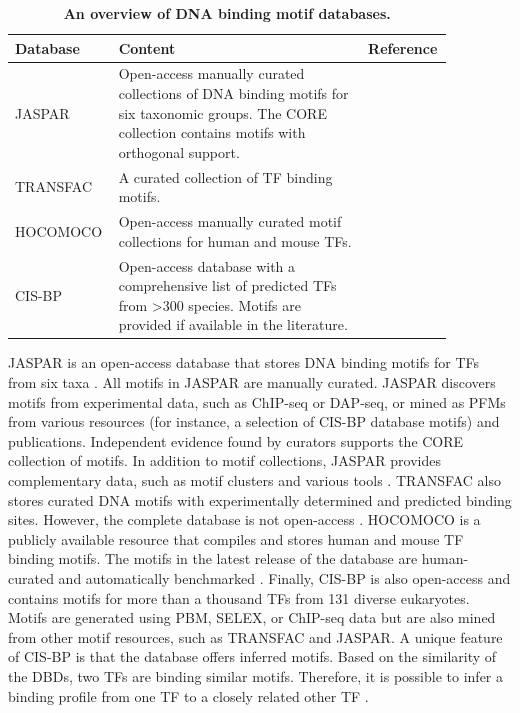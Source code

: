   \begin{table}[htbp]
    \centering
    \caption[An overview of motif databases]{\textbf{An overview of DNA binding motif databases.}}
    \label{motif_databases}
    \begin{tabular}{p{0.175\linewidth} p{0.55\linewidth} p{0.14\linewidth}}
        \toprule
        \textbf{Database}
        & 
        \textbf{Content}
        &
        \textbf{Reference}
        \\
        \midrule
        JASPAR
        & 
        Open-access manually curated collections of DNA binding motifs for six taxonomic groups. The CORE collection contains motifs with orthogonal support.
        &
        \cite{rauluseviciute2024jaspar}
        \\[0.3ex]
        TRANSFAC
        &
        A curated collection of TF binding motifs.
        &
        \cite{wingender2008transfac}
        \\[0.3ex]
        HOCOMOCO
        &
        Open-access manually curated motif collections for human and mouse TFs.
        &
        \cite{vorontsov2024hocomoco}
        \\[0.3ex]
        CIS-BP
        &
        Open-access database with a comprehensive list of predicted TFs from >300 species. Motifs are provided if available in the literature.
        &
        \cite{lambert2018human}
        \\
        \bottomrule
    \end{tabular}
\end{table}
  
  JASPAR is an open-access database that stores DNA binding motifs for TFs from six taxa \cite{rauluseviciute2024jaspar}. All motifs in JASPAR are manually curated. JASPAR discovers motifs from experimental data, such as ChIP-seq or DAP-seq, or mined as PFMs from various resources (for instance, a selection of CIS-BP database motifs) and publications. Independent evidence found by curators supports the CORE collection of motifs. In addition to motif collections, JASPAR provides complementary data, such as motif clusters and various tools \cite{rauluseviciute2024jaspar}. TRANSFAC also stores curated DNA motifs with experimentally determined and predicted binding sites. However, the complete database is not open-access \cite{matys2006transfac,wingender2008transfac}. HOCOMOCO is a publicly available resource that compiles and stores human and mouse TF binding motifs. The motifs in the latest release of the database are human-curated and automatically benchmarked \cite{vorontsov2024hocomoco}. Finally, CIS-BP is also open-access and contains motifs for more than a thousand TFs from 131 diverse eukaryotes. Motifs are generated using \ac{PBM}, SELEX, or ChIP-seq data but are also mined from other motif resources, such as TRANSFAC and JASPAR. A unique feature of CIS-BP is that the database offers inferred motifs. Based on the similarity of the DBDs, two TFs are binding similar motifs. Therefore, it is possible to infer a binding profile from one TF to a closely related other TF \cite{weirauch2014determination}.


